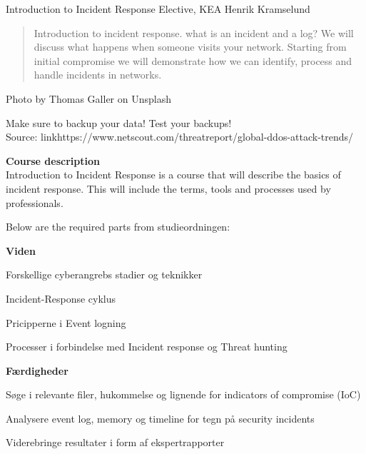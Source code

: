 \documentclass[Screen16to9,17pt]{foils}
\begin{document}
\mytitlepage
{Introduction to Incident Response Elective, KEA}
{Henrik Kramselund}




\begin{quote}
Introduction to incident response. what is an incident and a log? We will discuss what happens when someone visits your network. Starting from initial compromise we will demonstrate how we can identify, process and handle incidents in networks.
\end{quote}

{\hfill \small Photo by Thomas Galler on Unsplash}




Make sure to backup your data! Test your backups!\\
Source: link{https://www.netscout.com/threatreport/global-ddos-attack-trends/}



{\bf Course description}\\
Introduction to Incident Response is a course that will describe the basics of incident response. This will include the terms, tools and processes used by professionals.

Below are the required parts from studieordningen:

{\bf Viden}
\begin{list2}
\item Forskellige cyberangrebs stadier og teknikker
\item Incident-Response cyklus
\item Pricipperne i Event logning
\item Processer i forbindelse med Incident response og Threat hunting
\end{list2}


{\bf Færdigheder}

\begin{list2}
\item Søge i relevante filer, hukommelse og lignende for indicators of compromise (IoC)
\item Analysere event log, memory og timeline for tegn på security incidents
\item Viderebringe resultater i form af ekspertrapporter
\end{list2}
\end{document}
